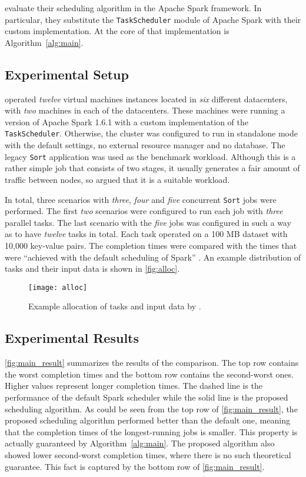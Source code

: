 \citet{Chen2017} evaluate their scheduling algorithm in the Apache Spark framework. In particular, they substitute the \texttt{TaskScheduler} module of Apache Spark with their custom implementation. At the core of that implementation is Algorithm~\ref{alg:main}.

\subsection{Experimental Setup}

\citet{Chen2017} operated \emph{twelve} virtual machines instances located in \emph{six} different datacenters, with \emph{two} machines in each of the datacenters. These machines were running a version of Apache Spark 1.6.1 with a custom implementation of the \texttt{TaskScheduler}. Otherwise, the cluster was configured to run in standalone mode with the default settings, no external resource manager and no database. The legacy \texttt{Sort} application was used as the benchmark workload. Although this is a rather simple job that consists of two stages, it usually generates a fair amount of traffic between nodes, so \citet{Chen2017} argued that it is a suitable workload.

In total, three scenarios with \emph{three}, \emph{four} and \emph{five} concurrent \texttt{Sort} jobs were performed. The first \emph{two} scenarios were configured to run each job with \emph{three} parallel tasks. The last scenario with the \emph{five} jobs was configured in such a way as to have \emph{twelve} tasks in total. Each task operated on a 100 MB dataset with 10,000 key-value pairs. The completion times were compared with the times that were ``achieved with the default scheduling of Spark'' \citet{Chen2017}. An example distribution of tasks and their input data is shown in \autoref{fig:alloc}.

\begin{figure}
  \centering
  \texttt{[image: alloc]} \\
  \caption{Example allocation of tasks and input data by \citet{Chen2017}.}
  \label{fig:alloc}
\end{figure}


\subsection{Experimental Results}

\autoref{fig:main_result} summarizes the results of the comparison. The top row contains the worst completion times and the bottom row contains the second-worst ones. Higher values represent longer completion times. The dashed line is the performance of the default Spark scheduler while the solid line is the proposed scheduling algorithm. As could be seen from the top row of \autoref{fig:main_result}, the proposed scheduling algorithm performed better than the default one, meaning that the completion times of the longest-running jobs is smaller. This property is actually guaranteed by Algorithm~\ref{alg:main}. The proposed algorithm also showed lower second-worst completion times, where there is no such theoretical guarantee. This fact is captured by the bottom row of \autoref{fig:main_result}.

